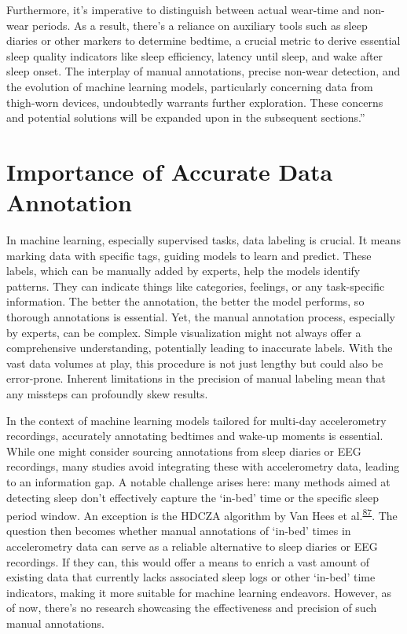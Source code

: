 \documentclass[
  10pt,
]{scrbook}
\begin{document}
Furthermore, it's imperative to distinguish between actual wear-time and
non-wear periods. As a result, there's a reliance on auxiliary tools
such as sleep diaries or other markers to determine bedtime, a crucial
metric to derive essential sleep quality indicators like sleep
efficiency, latency until sleep, and wake after sleep onset. The
interplay of manual annotations, precise non-wear detection, and the
evolution of machine learning models, particularly concerning data from
thigh-worn devices, undoubtedly warrants further exploration. These
concerns and potential solutions will be expanded upon in the subsequent
sections.''

\hypertarget{importance-of-accurate-data-annotation}{%
\section{Importance of Accurate Data
Annotation}\label{importance-of-accurate-data-annotation}}

In machine learning, especially supervised tasks, data labeling is
crucial. It means marking data with specific tags, guiding models to
learn and predict. These labels, which can be manually added by experts,
help the models identify patterns. They can indicate things like
categories, feelings, or any task-specific information. The better the
annotation, the better the model performs, so thorough annotations is
essential. Yet, the manual annotation process, especially by experts,
can be complex. Simple visualization might not always offer a
comprehensive understanding, potentially leading to inaccurate labels.
With the vast data volumes at play, this procedure is not just lengthy
but could also be error-prone. Inherent limitations in the precision of
manual labeling mean that any missteps can profoundly skew results.

In the context of machine learning models tailored for multi-day
accelerometry recordings, accurately annotating bedtimes and wake-up
moments is essential. While one might consider sourcing annotations from
sleep diaries or EEG recordings, many studies avoid integrating these
with accelerometry data, leading to an information gap. A notable
challenge arises here: many methods aimed at detecting sleep don't
effectively capture the `in-bed' time or the specific sleep period
window. An exception is the HDCZA algorithm by Van Hees et
al.\textsuperscript{\protect\hyperlink{ref-van_hees_estimating_2018}{87}}.
The question then becomes whether manual annotations of `in-bed' times
in accelerometry data can serve as a reliable alternative to sleep
diaries or EEG recordings. If they can, this would offer a means to
enrich a vast amount of existing data that currently lacks associated
sleep logs or other `in-bed' time indicators, making it more suitable
for machine learning endeavors. However, as of now, there's no research
showcasing the effectiveness and precision of such manual annotations.
\end{document}
